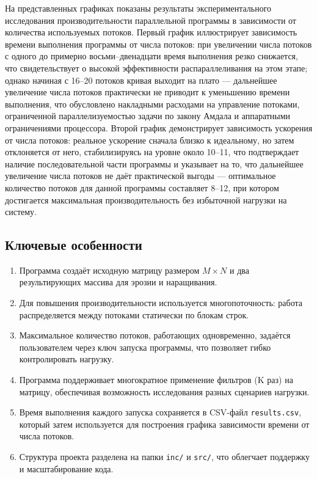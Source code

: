 На представленных графиках показаны результаты экспериментального исследования производительности параллельной программы в зависимости от количества используемых потоков. 
Первый график иллюстрирует зависимость времени выполнения программы от числа потоков: при увеличении числа потоков с одного до примерно восьми–двенадцати время выполнения резко снижается, что свидетельствует о высокой эффективности распараллеливания на этом этапе; однако начиная с 16–20 потоков кривая выходит на плато — дальнейшее увеличение числа потоков практически не приводит к уменьшению времени выполнения, что обусловлено накладными расходами на управление потоками, ограниченной параллелизуемостью задачи по закону Амдала и аппаратными ограничениями процессора.
Второй график демонстрирует зависимость ускорения от числа потоков: реальное ускорение сначала близко к идеальному, но затем отклоняется от него, стабилизируясь на уровне около 10–11, что подтверждает наличие последовательной части программы и указывает на то, что дальнейшее увеличение числа потоков не даёт практической выгоды — оптимальное количество потоков для данной программы составляет 8–12, при котором достигается максимальная производительность без избыточной нагрузки на систему.

\subsection*{Ключевые особенности}
\begin{enumerate}
    \item Программа создаёт исходную матрицу размером $M \times N$ и два результирующих массива для эрозии и наращивания.
    \item Для повышения производительности используется многопоточность: работа распределяется между потоками статически по блокам строк.
    \item Максимальное количество потоков, работающих одновременно, задаётся пользователем через ключ запуска программы, что позволяет гибко контролировать нагрузку.
    \item Программа поддерживает многократное применение фильтров (K раз) на матрицу, обеспечивая возможность исследования разных сценариев нагрузки.
    \item Время выполнения каждого запуска сохраняется в CSV-файл \texttt{results.csv}, который затем используется для построения графика зависимости времени от числа потоков.
    \item Структура проекта разделена на папки \texttt{inc/} и \texttt{src/}, что облегчает поддержку и масштабирование кода.
\end{enumerate}
